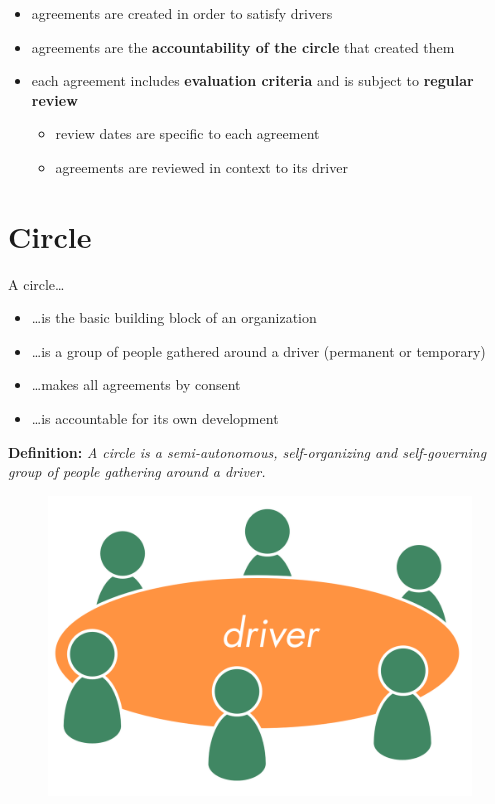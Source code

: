 \begin{itemize}
\item agreements are created in order to satisfy drivers

\item agreements are the \textbf{accountability of the circle} that created them

\item each agreement includes \textbf{evaluation criteria} and is subject to \textbf{regular review}

\begin{itemize}
\item review dates are specific to each agreement

\item agreements are reviewed in context to its driver

\end{itemize}

\end{itemize}

\section{Circle}
\label{circle}

A circle{\ldots}

\begin{itemize}
\item {\ldots}is the basic building block of an organization

\item {\ldots}is a group of people gathered around a driver (permanent or temporary)

\item {\ldots}makes all agreements by consent

\item {\ldots}is accountable for its own development

\end{itemize}

\textbf{Definition:} \emph{A circle is a semi-autonomous, self-organizing and self-governing group of people gathering around a driver.}

\begin{figure}[htbp]
\centering
\includegraphics[keepaspectratio,width=\textwidth,height=0.75\textheight]{img/circle/circle-driver.png}
\end{figure}

